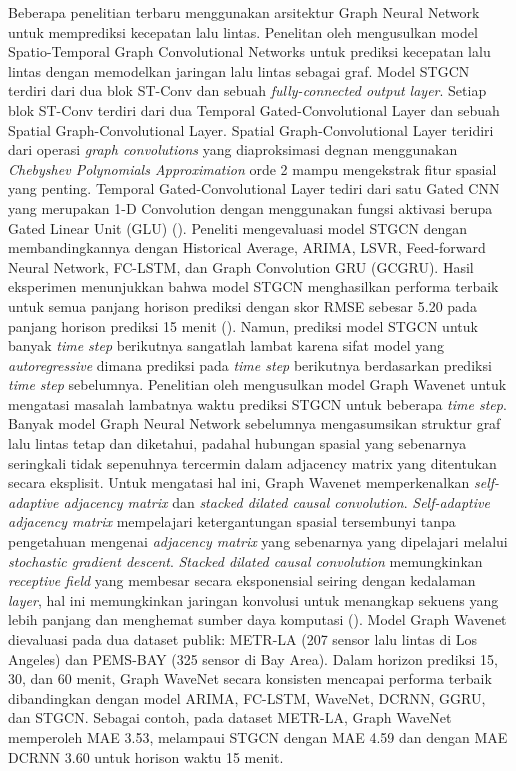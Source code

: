 Beberapa penelitian terbaru menggunakan arsitektur Graph Neural Network untuk memprediksi kecepatan lalu lintas. Penelitan oleh \cite{Yu2018} mengusulkan model Spatio-Temporal Graph Convolutional Networks untuk prediksi kecepatan lalu lintas dengan memodelkan jaringan lalu lintas sebagai graf. Model STGCN terdiri dari dua blok ST-Conv dan sebuah \textit{fully-connected output layer}. Setiap blok ST-Conv terdiri dari dua Temporal Gated-Convolutional Layer dan sebuah Spatial Graph-Convolutional Layer. Spatial Graph-Convolutional Layer teridiri dari operasi \textit{graph convolutions} yang diaproksimasi degnan menggunakan \textit{Chebyshev Polynomials Approximation} orde 2 mampu mengekstrak fitur spasial yang penting. Temporal Gated-Convolutional Layer tediri dari satu Gated CNN yang merupakan 1-D Convolution dengan menggunakan fungsi aktivasi berupa Gated Linear Unit (GLU) (\cite{Gehring2017}). Peneliti mengevaluasi model STGCN dengan membandingkannya dengan Historical Average, ARIMA, LSVR, Feed-forward Neural Network, FC-LSTM, dan Graph Convolution GRU (GCGRU).  Hasil eksperimen menunjukkan bahwa model STGCN menghasilkan performa terbaik untuk semua panjang horison prediksi dengan skor RMSE sebesar 5.20 pada panjang horison prediksi 15 menit (\cite{Yu2018}). Namun, prediksi model STGCN untuk banyak \textit{time step} berikutnya sangatlah lambat karena sifat model yang \textit{autoregressive} dimana prediksi pada \textit{time step} berikutnya berdasarkan prediksi \textit{time step} sebelumnya. Penelitian oleh \cite{Wu2019} mengusulkan model Graph Wavenet untuk mengatasi masalah lambatnya waktu prediksi STGCN untuk beberapa \textit{time step}. Banyak model Graph Neural Network sebelumnya mengasumsikan struktur graf lalu lintas tetap dan diketahui, padahal hubungan spasial yang sebenarnya seringkali tidak sepenuhnya tercermin dalam adjacency matrix yang ditentukan secara eksplisit. Untuk mengatasi hal ini, Graph Wavenet memperkenalkan \textit{self-adaptive adjacency matrix} dan \textit{stacked dilated causal convolution}. \textit{Self-adaptive adjacency matrix} mempelajari ketergantungan spasial tersembunyi tanpa pengetahuan mengenai \textit{adjacency matrix} yang sebenarnya yang dipelajari melalui \textit{stochastic gradient descent}. \textit{Stacked dilated causal convolution} memungkinkan \textit{receptive field} yang membesar secara eksponensial seiring dengan kedalaman \textit{layer}, hal ini memungkinkan jaringan konvolusi untuk menangkap sekuens yang lebih panjang  dan menghemat sumber daya komputasi (\cite{Wu2019}).  Model Graph Wavenet dievaluasi pada dua dataset publik: METR-LA (207 sensor lalu lintas di Los Angeles) dan PEMS-BAY (325 sensor di Bay Area). Dalam horizon prediksi 15, 30, dan 60 menit, Graph WaveNet secara konsisten mencapai performa terbaik dibandingkan dengan model ARIMA, FC-LSTM, WaveNet, DCRNN, GGRU, dan STGCN. Sebagai contoh, pada dataset METR-LA, Graph WaveNet memperoleh  MAE 3.53, melampaui STGCN dengan MAE 4.59 dan dengan MAE DCRNN 3.60 untuk horison waktu 15 menit.

